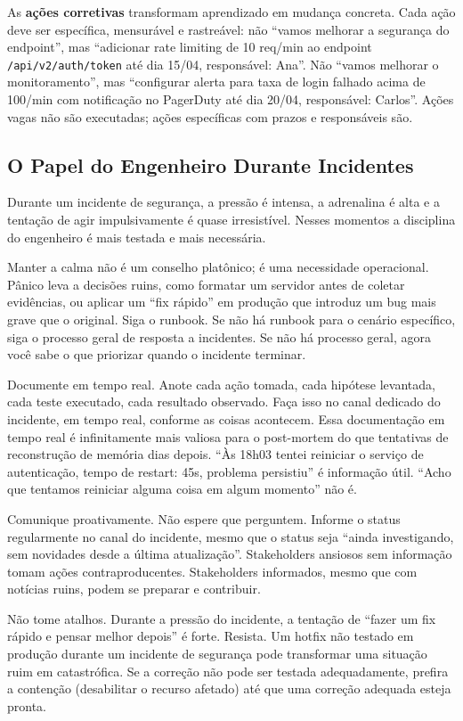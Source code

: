 As \textbf{ações corretivas} transformam aprendizado em mudança concreta. Cada
ação deve ser específica, mensurável e rastreável: não ``vamos melhorar a
segurança do endpoint'', mas ``adicionar rate limiting de 10 req/min ao endpoint
\texttt{/api/v2/auth/token} até dia 15/04, responsável: Ana''. Não ``vamos
melhorar o monitoramento'', mas ``configurar alerta para taxa de login falhado
acima de 100/min com notificação no PagerDuty até dia 20/04, responsável: Carlos''.
Ações vagas não são executadas; ações específicas com prazos e responsáveis são.

\subsection{O Papel do Engenheiro Durante Incidentes}

Durante um incidente de segurança, a pressão é intensa, a adrenalina é alta e
a tentação de agir impulsivamente é quase irresistível. Nesses momentos a
disciplina do engenheiro é mais testada e mais necessária.

Manter a calma não é um conselho platônico; é uma necessidade operacional.
Pânico leva a decisões ruins, como formatar um servidor antes de coletar
evidências, ou aplicar um ``fix rápido'' em produção que introduz um bug mais
grave que o original. Siga o runbook. Se não há runbook para o cenário
específico, siga o processo geral de resposta a incidentes. Se não há processo
geral, agora você sabe o que priorizar quando o incidente terminar.

Documente em tempo real. Anote cada ação tomada, cada hipótese levantada, cada
teste executado, cada resultado observado. Faça isso no canal dedicado do
incidente, em tempo real, conforme as coisas acontecem. Essa documentação em
tempo real é infinitamente mais valiosa para o post-mortem do que tentativas de
reconstrução de memória dias depois. ``Às 18h03 tentei reiniciar o serviço
de autenticação, tempo de restart: 45s, problema persistiu'' é informação útil.
``Acho que tentamos reiniciar alguma coisa em algum momento'' não é.

Comunique proativamente. Não espere que perguntem. Informe o status
regularmente no canal do incidente, mesmo que o status seja ``ainda
investigando, sem novidades desde a última atualização''. Stakeholders ansiosos
sem informação tomam ações contraproducentes. Stakeholders informados, mesmo que
com notícias ruins, podem se preparar e contribuir.

Não tome atalhos. Durante a pressão do incidente, a tentação de ``fazer um fix
rápido e pensar melhor depois'' é forte. Resista. Um hotfix não testado em
produção durante um incidente de segurança pode transformar uma situação ruim
em catastrófica. Se a correção não pode ser testada adequadamente, prefira
a contenção (desabilitar o recurso afetado) até que uma correção adequada
esteja pronta.


